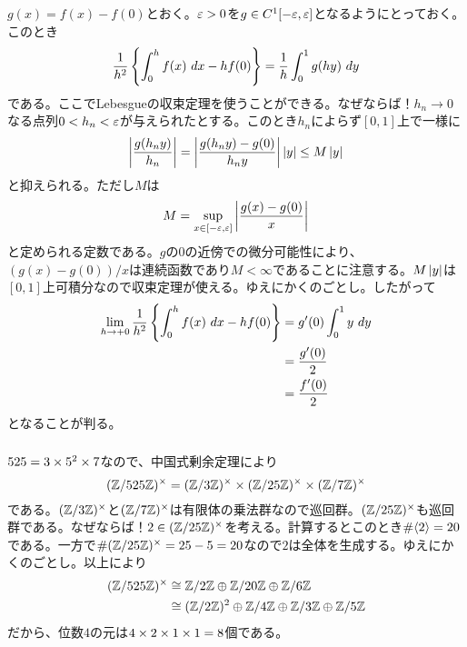 \subsubsection{}%
\begin{sol}
  $g(x) = f(x) - f(0)$とおく。${\varepsilon} > 0$を$g \in C^1[-{\varepsilon}, {\varepsilon}]$となるようにとっておく。このとき
  \[
 \frac{1}{h^2} \left\{ \int_0^h f(x) \ dx - h f(0) \right\} = \frac{1}{h} \int_0^1 g(hy) \ dy
  \]
  である。ここでLebesgueの収束定理を使うことができる。なぜならば！$h_n \to 0$なる点列$0 < h_n < {\varepsilon}$が与えられたとする。このとき$h_n$によらず$[0,1]$上で一様に
  \[
  \left \lvert  \frac{g(h_n y) }{h_n}   \right \rvert =   \left \lvert  \frac{g(h_n y) - g(0) }{h_n y}   \right \rvert \left \lvert y \right \rvert \leq M \left \lvert y \right \rvert
  \]
  と抑えられる。ただし$M$は
\[
M = \sup_{x \in [- {\varepsilon}, {\varepsilon}]} \left \lvert  \frac{g(x) - g(0)}{x}   \right \rvert
\]
と定められる定数である。$g$の$0$の近傍での微分可能性により、$(g(x)-g(0))/x$は連続函数であり$M < \infty$であることに注意する。$M\left \lvert y \right \rvert$は$[0,1]$上可積分なので収束定理が使える。ゆえにかくのごとし。したがって
\begin{align*}
  \lim_{h \to + 0} \frac{1}{h^2} \left\{ \int_0^h f(x) \ dx - h f(0) \right\} &= g'(0) \int_0^1 y \ dy \\
  &= \frac{g'(0)}{2} \\
  &= \frac{f'(0)}{2}
\end{align*}
となることが判る。
\end{sol}



\newpage

\subsubsection{}%
\begin{sol}
  $525 = 3 \times 5^2 \times 7$なので、中国式剰余定理により
  \[
  (\mathbb{Z} / 525 \mathbb{Z})^{\times} = (\mathbb{Z} / 3 \mathbb{Z})^{\times} \times (\mathbb{Z} / 25 \mathbb{Z})^{\times} \times (\mathbb{Z} / 7 \mathbb{Z})^{\times}
  \]
  である。$(\mathbb{Z} / 3 \mathbb{Z})^{\times}$と$(\mathbb{Z} / 7 \mathbb{Z})^{\times}$は有限体の乗法群なので巡回群。$(\mathbb{Z} / 25 \mathbb{Z})^{\times}$も巡回群である。なぜならば！$2 \in (\mathbb{Z} / 25 \mathbb{Z})^{\times}$を考える。計算するとこのとき$\# \langle 2 \rangle = 20$である。一方で$\# (\mathbb{Z} / 25 \mathbb{Z})^{\times} = 25 -5 = 20$なので$2$は全体を生成する。ゆえにかくのごとし。以上により
  \begin{align*}
      (\mathbb{Z} / 525 \mathbb{Z})^{\times} &\cong \mathbb{Z} / 2 \mathbb{Z} \oplus \mathbb{Z} / 20 \mathbb{Z} \oplus \mathbb{Z} / 6 \mathbb{Z} \\
      &\cong (\mathbb{Z} / 2 \mathbb{Z})^2 \oplus \mathbb{Z} / 4 \mathbb{Z} \oplus \mathbb{Z} / 3 \mathbb{Z} \oplus \mathbb{Z} / 5 \mathbb{Z}
  \end{align*}
  だから、位数$4$の元は$4 \times 2 \times 1 \times 1 = 8$個である。
\end{sol}

